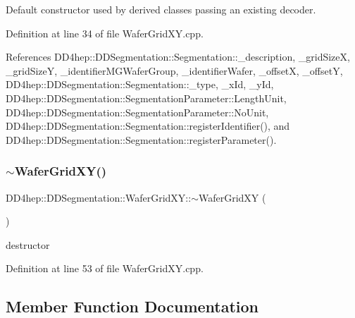 Default constructor used by derived classes passing an existing decoder. 



Definition at line 34 of file Wafer\+Grid\+X\+Y.\+cpp.



References D\+D4hep\+::\+D\+D\+Segmentation\+::\+Segmentation\+::\+\_\+description, \+\_\+grid\+SizeX, \+\_\+grid\+SizeY, \+\_\+identifier\+M\+G\+Wafer\+Group, \+\_\+identifier\+Wafer, \+\_\+offsetX, \+\_\+offsetY, D\+D4hep\+::\+D\+D\+Segmentation\+::\+Segmentation\+::\+\_\+type, \+\_\+x\+Id, \+\_\+y\+Id, D\+D4hep\+::\+D\+D\+Segmentation\+::\+Segmentation\+Parameter\+::\+Length\+Unit, D\+D4hep\+::\+D\+D\+Segmentation\+::\+Segmentation\+Parameter\+::\+No\+Unit, D\+D4hep\+::\+D\+D\+Segmentation\+::\+Segmentation\+::register\+Identifier(), and D\+D4hep\+::\+D\+D\+Segmentation\+::\+Segmentation\+::register\+Parameter().

\hypertarget{class_d_d4hep_1_1_d_d_segmentation_1_1_wafer_grid_x_y_a07377755b469f13a9fea18473a39959e}{}\label{class_d_d4hep_1_1_d_d_segmentation_1_1_wafer_grid_x_y_a07377755b469f13a9fea18473a39959e} 
\subsubsection{\texorpdfstring{$\sim$\+Wafer\+Grid\+X\+Y()}{~WaferGridXY()}}
{\footnotesize\ttfamily D\+D4hep\+::\+D\+D\+Segmentation\+::\+Wafer\+Grid\+X\+Y\+::$\sim$\+Wafer\+Grid\+XY (\begin{DoxyParamCaption}{ }\end{DoxyParamCaption})\hspace{0.3cm}{\ttfamily [virtual]}}



destructor 



Definition at line 53 of file Wafer\+Grid\+X\+Y.\+cpp.



\subsection{Member Function Documentation}
\hypertarget{class_d_d4hep_1_1_d_d_segmentation_1_1_wafer_grid_x_y_a0f578347fbddd8cc394d4663f3f6176c}{}\label{class_d_d4hep_1_1_d_d_segmentation_1_1_wafer_grid_x_y_a0f578347fbddd8cc394d4663f3f6176c} 

